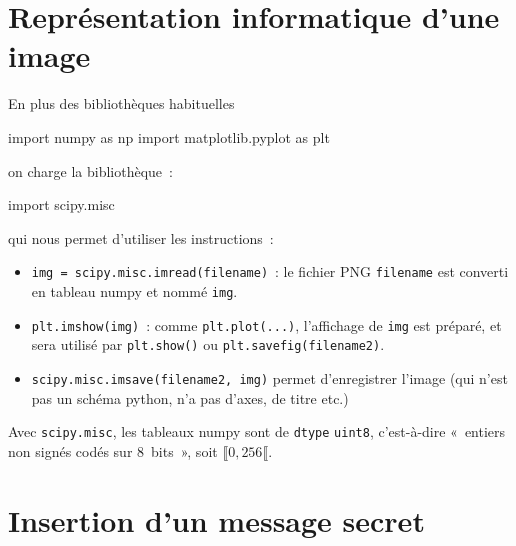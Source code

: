 \section{Représentation informatique d'une image}
 
En plus des bibliothèques habituelles
\begin{python}
import numpy as np
import matplotlib.pyplot as plt
\end{python}
on charge la bibliothèque~:
\begin{python}
import scipy.misc
\end{python}
qui nous permet d'utiliser les instructions~: 
\begin{itemize}
\item 
  \verb#img = scipy.misc.imread(filename)#~: le fichier PNG \verb#filename#
  est converti en tableau numpy et nommé \verb#img#.
\item 
  \verb#plt.imshow(img)#~: comme \verb#plt.plot(...)#, l'affichage de
  \verb#img# est préparé, et sera utilisé par \verb#plt.show()# ou
  \verb#plt.savefig(filename2)#.
\item
  \verb#scipy.misc.imsave(filename2, img)# permet d'enregistrer l'image
  (qui n'est pas un schéma python, n'a pas d'axes, de titre etc.)
\end{itemize}

\begin{remark}
  Avec \texttt{scipy.misc}, les tableaux numpy sont de
  \texttt{dtype} \texttt{uint8}, c'est-à-dire «~entiers non signés
  codés sur 8~bits~», soit $\llbracket 0 , 256\llbracket$. 
\end{remark}


\section{Insertion d'un message secret}

